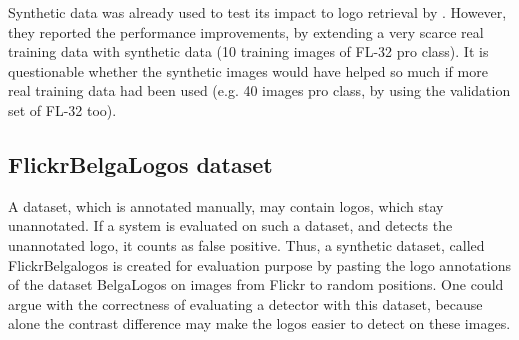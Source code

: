Synthetic data was already used to test its impact to logo retrieval by \cite{DBLP:journals/corr/SuZG16}. However, they reported the performance improvements, by extending a very scarce real training data with synthetic data (10 training images of FL-32 pro class). It is questionable whether the synthetic images would have helped so much if more real training data had been used (e.g. 40 images pro class, by using the validation set of FL-32 too).
\bigbreak
\subsection{FlickrBelgaLogos dataset}\label{ss:flickrbelgalogos}

A dataset, which is annotated manually, may contain logos, which stay unannotated. If a system is evaluated on such a dataset, and detects the unannotated logo, it counts as false positive. Thus, a synthetic dataset, called FlickrBelgalogos \cite{letessier2012scalable} is created for evaluation purpose by pasting the logo annotations of the dataset BelgaLogos \cite{belgalogos09} on images from Flickr to random positions. One could argue with the correctness of evaluating a detector with this dataset, because alone the contrast difference may make the logos easier to detect on these images.

